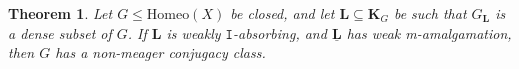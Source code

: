 \documentclass[12pt]{amsart}
\numberwithin{equation}{section}
\theoremstyle{plain}
\newtheorem{theorem}{Theorem}[section]
\theoremstyle{definition}
\newcommand \Homeo{ \mbox{Homeo}}
\newcommand \mesh{{\rm{ mesh}}}
\newcommand \sqsp{\sqsupset}
\newcommand \la{\leftarrow}
\newcommand{\cl}{\mbox{cl}}
\newcommand \KKb{\mathbf{K}}
\newcommand \LLb{\mathbf{L}}
\newcommand \LLub{\underline{\mathbf{L}}}
\newcommand \NN{\mathbb{N}}
\newcommand \It{\mathtt{I}}
\begin{document}



\begin{theorem}
\label{th:AmalNonMeager}
Let $G \leq \Homeo(X)$ be closed, and let $\LLb \subseteq \KKb_G$ be such that $G_\LLb$ is a dense subset of $G$. If $\LLb$ is weakly $\It$-absorbing, and $\LLub$ has weak m-amalgamation, then $G$ has a non-meager conjugacy class.  %
\end{theorem}
\end{document}
